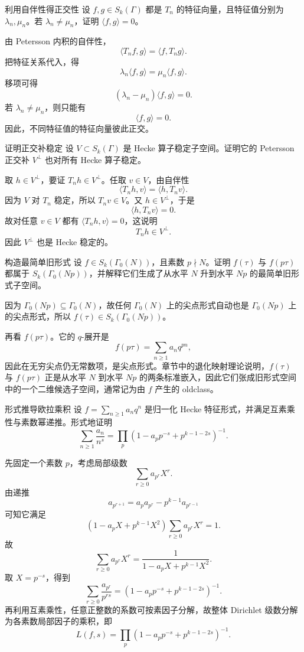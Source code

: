 \begin{problem}{利用自伴性得正交性}
\medium
设 $f,g\in S_k(\Gamma)$ 都是 $T_n$ 的特征向量，且特征值分别为 $\lambda_n,\mu_n$。若 $\lambda_n\ne\mu_n$，证明 $\langle f,g\rangle=0$。
\end{problem}
\begin{solution}
由 Petersson 内积的自伴性，
\[
\langle T_nf,g\rangle=\langle f,T_ng\rangle.
\]
把特征关系代入，得
\[
\lambda_n\langle f,g\rangle=\mu_n\langle f,g\rangle.
\]
移项可得
\[
(\lambda_n-\mu_n)\langle f,g\rangle=0.
\]
若 $\lambda_n\ne\mu_n$，则只能有
\[
\langle f,g\rangle=0.
\]
因此，不同特征值的特征向量彼此正交。
\end{solution}

\begin{problem}{证明正交补稳定}
\medium
设 $V\subset S_k(\Gamma)$ 是 Hecke 算子稳定子空间。证明它的 Petersson 正交补 $V^{\perp}$ 也对所有 Hecke 算子稳定。
\end{problem}
\begin{solution}
取 $h\in V^{\perp}$，要证 $T_nh\in V^{\perp}$。任取 $v\in V$，由自伴性
\[
\langle T_nh,v\rangle=\langle h,T_nv\rangle.
\]
因为 $V$ 对 $T_n$ 稳定，所以 $T_nv\in V$。又 $h\in V^{\perp}$，于是
\[
\langle h,T_nv\rangle=0.
\]
故对任意 $v\in V$ 都有 $\langle T_nh,v\rangle=0$，这说明
\[
T_nh\in V^{\perp}.
\]
因此 $V^{\perp}$ 也是 Hecke 稳定的。
\end{solution}

\begin{problem}{构造最简单旧形式}
\medium
设 $f\in S_k(\Gamma_0(N))$，且素数 $p\nmid N$。证明 $f(\tau)$ 与 $f(p\tau)$ 都属于 $S_k(\Gamma_0(Np))$，并解释它们生成了从水平 $N$ 升到水平 $Np$ 的最简单旧形式子空间。
\end{problem}
\begin{solution}
因为 $\Gamma_0(Np)\subseteq\Gamma_0(N)$，故任何 $\Gamma_0(N)$ 上的尖点形式自动也是 $\Gamma_0(Np)$ 上的尖点形式，所以 $f(\tau)\in S_k(\Gamma_0(Np))$。

再看 $f(p\tau)$。它的 $q$-展开是
\[
f(p\tau)=\sum_{n\ge1}a_nq^{pn},
\]
因此在无穷尖点仍无常数项，是尖点形式。章节中的退化映射理论说明，$f(\tau)$ 与 $f(p\tau)$ 正是从水平 $N$ 到水平 $Np$ 的两条标准嵌入，因此它们张成旧形式空间中的一个二维候选子空间，通常记为由 $f$ 产生的 oldclass。
\end{solution}

\begin{problem}{形式推导欧拉乘积}
\medium
设 $f=\sum_{n\ge1}a_nq^n$ 是归一化 Hecke 特征形式，并满足互素乘性与素数幂递推。形式地证明
\[
\sum_{n\ge1}\frac{a_n}{n^s}=\prod_p\left(1-a_pp^{-s}+p^{k-1-2s}\right)^{-1}.
\]
\end{problem}
\begin{solution}
先固定一个素数 $p$，考虑局部级数
\[
\sum_{r\ge0}a_{p^r}X^r.
\]
由递推
\[
a_{p^{r+1}}=a_pa_{p^r}-p^{k-1}a_{p^{r-1}}
\]
可知它满足
\[
\left(1-a_pX+p^{k-1}X^2\right)\sum_{r\ge0}a_{p^r}X^r=1.
\]
故
\[
\sum_{r\ge0}a_{p^r}X^r=\frac{1}{1-a_pX+p^{k-1}X^2}.
\]
取 $X=p^{-s}$，得到
\[
\sum_{r\ge0}\frac{a_{p^r}}{p^{rs}}=\left(1-a_pp^{-s}+p^{k-1-2s}\right)^{-1}.
\]
再利用互素乘性，任意正整数的系数可按素因子分解，故整体 Dirichlet 级数分解为各素数局部因子的乘积，即
\[
L(f,s)=\prod_p\left(1-a_pp^{-s}+p^{k-1-2s}\right)^{-1}.
\]
\end{solution}

